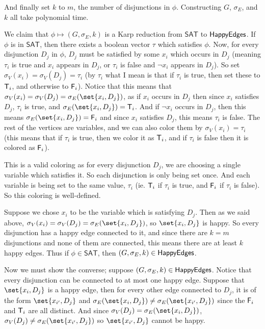 \documentclass[10pt]{article}
\def\sat{\mathsf{SAT}}
\begin{document}
And finally set $k$ to $m$, the number of disjunctions in $\phi$.
Constructing $G$, $\sigma_E$, and $k$ all take polynomial time.

We claim that $\phi\mapsto(G,\sigma_E,k)$ is a Karp reduction from $\sat$ to $\mathsf{HappyEdges}$.
If $\phi$ is in $\sat$, then there exists a boolean vector $\tau$ which satisfies $\phi$.
Now, for every disjunction $D_j$ in $\phi$, $D_j$ must be satisfied by some $x_i$ which occurs in $D_j$ (meaning $\tau_i$ is true and $x_i$ appears in $D_j$, or $\tau_i$ is false and $\neg x_i$ appears in
$D_j$).
So set $\sigma_V(x_i)=\sigma_V(D_j)=\tau_i$ (by $\tau_i$ what I mean is that if $\tau_i$ is true, then set these to $\mathsf{T}_i$, and otherwise to $\mathsf{F}_i$).
Notice that this means that $\sigma_V(x_i)=\sigma_V(D_j)=\sigma_E(\set{x_i,D_j})$, as if $x_i$ occurs in $D_j$ then since $x_i$ satisfies $D_j$, $\tau_i$ is true, and $\sigma_E(\set{x_i,D_j})=\T_i$.
And if $\neg x_i$ occurs in $D_j$, then this means $\sigma_E(\set{x_i,D_j})=\F_i$ and since $x_i$ satisfies $D_j$, this means $\tau_i$ is false.
The rest of the vertices are variables, and we can also color them by $\sigma_V(x_i)=\tau_i$ (this means that if $\tau_i$ is true, then we color it as $\mathsf{T}_i$, and if $\tau_i$ is false then it is colored as
$\mathsf{F}_i$).

This is a valid coloring as for every disjunction $D_j$, we are choosing a single variable which satisfies it.
So each disjunction is only being set once.
And each variable is being set to the same value, $\tau_i$ (ie. $\mathsf{T}_i$ if $\tau_i$ is true, and $\mathsf{F}_i$ if $\tau_i$ is false).
So this coloring is well-defined.

Suppose we chose $x_i$ to be the variable which is satisfying $D_j$.
Then as we said above, $\sigma_V(x_i)=\sigma_V(D_j)=\sigma_E(\set{x_i,D_j})$, so $\set{x_i,D_j}$ is happy.
So every disjunction has a happy edge connected to it, and since there are $k=m$ disjunctions and none of them are connected, this means there are at least $k$ happy edges.
Thus if $\phi\in\sat$, then $(G,\sigma_E,k)\in\mathsf{HappyEdges}$.

Now we must show the converse; suppose $(G,\sigma_E,k)\in\mathsf{HappyEdges}$.
Notice that every disjunction can be connected to at most one happy edge.
Suppose that $\set{x_i,D_j}$ is a happy edge, then for every other edge connected to $D_j$, it is of the form $\set{x_{i'},D_j}$ and $\sigma_E(\set{x_i,D_j})\neq\sigma_E(\set{x_{i'},D_j})$ since the
$\mathsf{F}_i$ and $\mathsf{T}_i$ are all distinct.
And since $\sigma_V(D_j)=\sigma_E(\set{x_i,D_j})$, $\sigma_V(D_j)\neq\sigma_E(\set{x_{i'},D_j})$ so $\set{x_{i'},D_j}$ cannot be happy.
\end{document}
